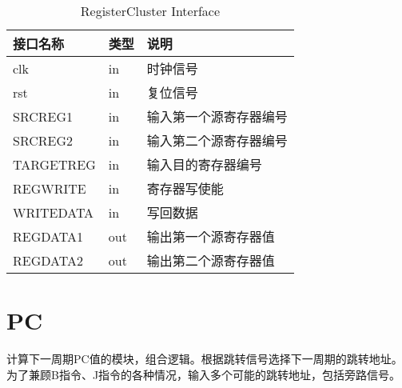 \begin{table}[H]
\begin{center}
\renewcommand{\arraystretch}{1.3}
\small
\caption{RegisterCluster Interface}
\label{tab:treatments}
\begin{tabular}{|p{3cm}<{\centering}|p{1.4cm}<{\centering}|p{7cm}<{\centering}|}
\hline
接口名称 & 类型 & 说明 \\
\hline
clk & in & 时钟信号 \\
\hline
rst & in & 复位信号 \\
\hline
SRCREG1 & in & 输入第一个源寄存器编号 \\
\hline
SRCREG2 & in & 输入第二个源寄存器编号 \\
\hline
TARGETREG & in & 输入目的寄存器编号 \\
\hline
REGWRITE & in & 寄存器写使能 \\
\hline
WRITEDATA & in & 写回数据 \\
\hline
REGDATA1 & out & 输出第一个源寄存器值 \\
\hline
REGDATA2 & out &  输出第二个源寄存器值\\
\hline
\end{tabular}
\end{center}
\end{table}


\section{PC}

计算下一周期PC值的模块，组合逻辑。根据跳转信号选择下一周期的跳转地址。为了兼顾B指令、J指令的各种情况，输入多个可能的跳转地址，包括旁路信号。

